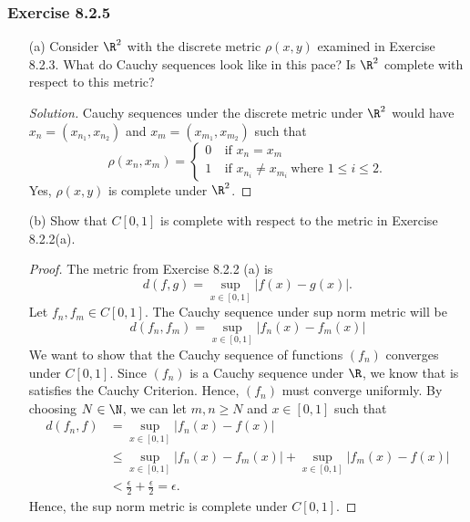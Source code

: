\subsubsection{Exercise 8.2.5} 
\begin{enumerate}
    \item[(a)] Consider \( \R^{2} \) with the discrete metric \( \rho(x,y)  \) examined in Exercise 8.2.3. What do Cauchy sequences look like in this pace? Is \( \R^{2} \) complete with respect to this metric? 
        \begin{proof}[Solution]
        Cauchy sequences under the discrete metric under \( \R^{2} \) would have \( x_{n} = (x_{n_{1}}, x_{n_{2}}) \) and \( x_{m} = (x_{m_{1}}, x_{m_{2}}) \) such that 
        \[ \rho(x_{n}, x_{m}) = 
        \begin{cases}
            0 \ &\text{if } x_{n } = x_{m} \\
            1 \ &\text{if } x_{n_{i} } \neq  x_{m_{i}} \ \text{where } 1 \leq i \leq 2.
        \end{cases} \]
        Yes, \( \rho(x,y)  \) is complete under \( \R^{2} \).
        \end{proof}
    \item[(b)] Show that \( C[0,1]  \) is complete with respect to the metric in Exercise 8.2.2(a).
        \begin{proof}
        The metric from Exercise 8.2.2 (a) is 
        \[  d(f,g) = \sup_{x \in [0,1]} | f(x) - g(x) |.    \]
        Let \( f_{n}, f_{m} \in C[0,1] \). The Cauchy sequence under sup norm metric will be 
        \[  d(f_{n}, f_{m}) = \sup_{x \in [0,1]} | f_{n}(x) - f_{m}(x) | \]
        We want to show that the Cauchy sequence of functions \( (f_{n}) \) converges under \( C[0,1] \). Since \( (f_{n}) \) is a Cauchy sequence under \( \R  \), we know that is satisfies the Cauchy Criterion. Hence, \( (f_{n}) \) must converge uniformly. By choosing \( N \in \N  \), we can let \( m, n \geq N  \) and \( x \in [0,1]  \) such that 
        \begin{align*}
            d(f_{n}, f) &= \sup_{x \in [0,1]} | f_{n}(x) - f(x)  |   \\
                        &\leq \sup_{x \in [0,1] } | f_{n}(x) - f_{m}(x)  | + \sup_{x \in [0,1]} | f_{m}(x) - f(x)  | \\
                        &< \frac{ \epsilon  }{ 2  }  + \frac{ \epsilon  }{ 2 } = \epsilon.
        \end{align*}
        Hence, the sup norm metric is complete under \( C[0,1] \).
        \end{proof}

\end{enumerate}
